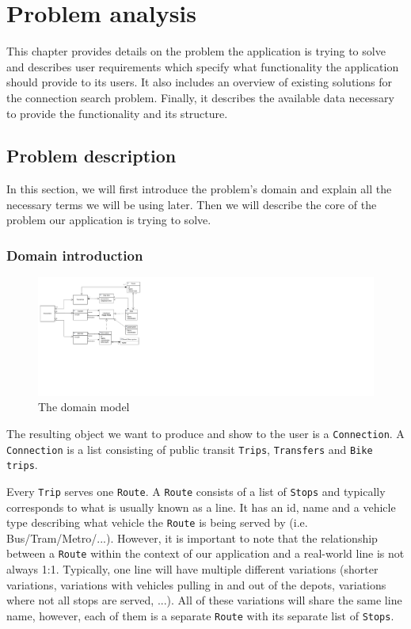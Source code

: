 \chapter{Problem analysis}

This chapter provides details on the problem the application is trying to solve and describes user requirements which specify what functionality the application should provide to its users. It also includes an overview of existing solutions for the connection search problem. Finally, it describes the available data necessary to provide the functionality and its structure.

\section{Problem description}

In this section, we will first introduce the problem's domain and explain all the necessary terms we will be using later. Then we will describe the core of the problem our application is trying to solve.

\subsection{Domain introduction}

\begin{figure}[h!]
    \includegraphics[width=\textwidth]{img/domain_model.pdf}
    \caption{The domain model}
    \label{fig:domain_model}
\end{figure}

The resulting object we want to produce and show to the user is a \texttt{Connection}. A \texttt{Connection} is a list consisting of public transit \texttt{Trips}, \texttt{Transfers} and \texttt{Bike trips}. 

Every \texttt{Trip} serves one \texttt{Route}. A \texttt{Route} consists of a list of \texttt{Stops} and typically corresponds to what is usually known as a line. It has an id, name and a vehicle type describing what vehicle the \texttt{Route} is being served by (i.e. Bus/Tram/Metro/...). However, it is important to note that the relationship between a \texttt{Route} within the context of our application and a real-world line is not always 1:1. Typically, one line will have multiple different variations (shorter variations, variations with vehicles pulling in and out of the depots, variations where not all stops are served, ...). All of these variations will share the same line name, however, each of them is a separate \texttt{Route} with its separate list of \texttt{Stops}.

